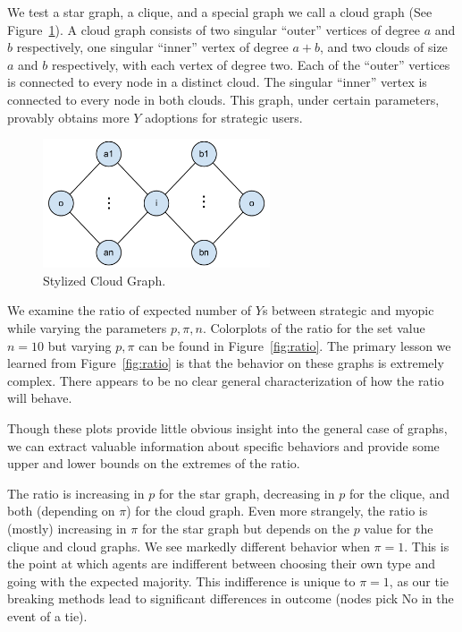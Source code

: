 \documentclass{article}
\begin{document}
We test a star graph, a clique, and a special graph we call a cloud
graph (See Figure~\ref{fig:cloud_graph}). A cloud graph consists of two singular ``outer'' vertices of
degree $a$ and $b$ respectively, one singular ``inner'' vertex of
degree $a+b$, and two clouds of size $a$ and $b$ respectively, with
each vertex of degree two. Each of the ``outer'' vertices is connected
to every node in a distinct cloud. The singular ``inner'' vertex is
connected to every node in both clouds. This graph, under certain
parameters, provably obtains more $Y$ adoptions for strategic users.

\begin{figure}
  \centering
  \includegraphics[width=0.6\textwidth]{cloud_graph.pdf}
  \caption{Stylized Cloud Graph.}
  \label{fig:cloud_graph}
\end{figure}

We examine the ratio of expected number of $Y$s between strategic and
myopic while varying the parameters $p, \pi, n$. Colorplots of the
ratio for the set value $n=10$ but varying $p, \pi$ can be found in
Figure~\ref{fig:ratio}. The primary lesson we learned from
Figure~\ref{fig:ratio} is that the behavior on these graphs is
extremely complex. There appears to be no clear general
characterization of how the ratio will behave.

Though these plots provide little obvious insight into the general
case of graphs, we can extract valuable information about specific
behaviors and provide some upper and lower bounds on the extremes of
the ratio.

The ratio is increasing in $p$ for the star graph, decreasing in $p$
for the clique, and both (depending on $\pi$) for the cloud
graph. Even more strangely, the ratio is (mostly) increasing in $\pi$
for the star graph but depends on the $p$ value for the clique and
cloud graphs. We see markedly different behavior when $\pi = 1$. This
is the point at which agents are indifferent between choosing their
own type and going with the expected majority. This indifference is
unique to $\pi=1$, as our tie breaking methods lead to significant
differences in outcome (nodes pick No in the event of a tie).
\end{document}
